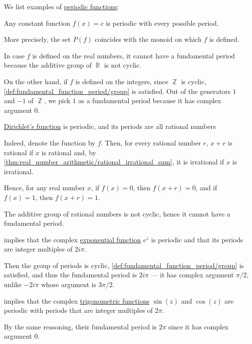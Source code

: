 \begin{example}\label{ex:def:periodic_function}
  We list examples of \hyperref[def:periodic_function]{periodic functions}:
  \begin{thmenum}
     Any constant function \( f(x) = c \) is periodic with every possible period.

    More precisely, the set \( P(f) \) coincides with the monoid on which \( f \) is defined.

    In case \( f \) is defined on the real numbers, it cannot have a fundamental period because the additive group of \( \BbbR \) is not cyclic.

    On the other hand, if \( f \) is defined on the integers, since \( \BbbZ \) is cyclic, \cref{def:fundamental_function_period/group} is satisfied. Out of the generators \( 1 \) and \( -1 \) of \( \BbbZ \), we pick \( 1 \) as a fundamental period because it has complex argument \( 0 \).

     \hyperref[def:dirichlet_function]{Dirichlet's function} is periodic, and its periods are all rational numbers

    Indeed, denote the function by \( f \). Then, for every rational number \( r \), \( x + r \) is rational if \( x \) is rational and, by \cref{thm:real_number_arithmetic/rational_irrational_sum}, it is irrational if \( x \) is irrational.

    Hence, for any real number \( x \), if \( f(x) = 0 \), then \( f(x + r) = 0 \), and if \( f(x) = 1 \), then \( f(x + r) = 1 \).

    The additive group of rational numbers is not cyclic, hence it cannot have a fundamental period.

      implies that the complex \hyperref[def:exponential_function]{exponential function} \( e^z \) is periodic and that its periods are integer multiples of \( 2i\pi \).

    Then the group of periods is cyclic, \cref{def:fundamental_function_period/group} is satisfied, and thus the fundamental period is \( 2i\pi \) ---  it has complex argument \( \pi/2 \), unlike \( -2i\pi \) whose argument is \( 3\pi/2 \).

      implies that the complex \hyperref[def:trigonometric_functions]{trigonometric functions} \( \sin(z) \) and \( \cos(z) \) are periodic with periods that are integer multiples of \( 2\pi \).

    By the same reasoning, their fundamental period is \( 2\pi \) since it has complex argument \( 0 \).
  \end{thmenum}
\end{example}

